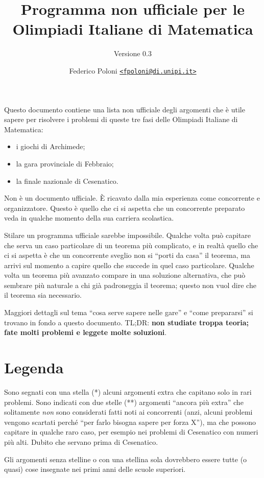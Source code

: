 \documentclass[a4paper,10pt]{paper}
\date{}
\title{Programma non ufficiale per le Olimpiadi Italiane di Matematica}
\subtitle{Versione 0.3}
\author{Federico Poloni \href{mailto:fpoloni@di.unipi.it}{\texttt{<fpoloni@di.unipi.it>}}}
\renewcommand{\star}{(*)}
\newcommand{\sstar}{(**)}
\begin{document}
 \maketitle
 
 Questo documento contiene una lista non ufficiale degli argomenti che è utile sapere per risolvere i problemi di queste tre fasi delle Olimpiadi Italiane di Matematica:
 \begin{itemize}
  \item i giochi di Archimede;
  \item la gara provinciale di Febbraio;
  \item la finale nazionale di Cesenatico.
 \end{itemize}

 Non è un documento ufficiale. È ricavato dalla mia esperienza come concorrente e organizzatore. Questo è quello che ci si aspetta che un concorrente preparato veda in qualche momento della sua carriera scolastica.
 
 Stilare un programma ufficiale sarebbe impossibile. Qualche volta può capitare che serva un caso particolare di un teorema più complicato, e in realtà quello che ci si aspetta è che un concorrente sveglio non si ``porti da casa'' il teorema, ma arrivi sul momento a capire quello che succede in quel caso particolare. Qualche volta un teorema più avanzato compare in una soluzione alternativa, che può sembrare più naturale a chi già padroneggia il teorema; questo non vuol dire che il teorema sia necessario.

 Maggiori dettagli sul tema ``cosa serve sapere nelle gare'' e ``come prepararsi'' si trovano in fondo a questo documento. TL;DR: \textbf{non studiate troppa teoria; fate molti problemi e leggete molte soluzioni}.
 
\section{Legenda}
Sono segnati con una stella \star{} alcuni argomenti extra che capitano solo in rari problemi. Sono indicati con due stelle \sstar{} argomenti ``ancora più extra'' che solitamente \emph{non} sono considerati fatti noti ai concorrenti (anzi, alcuni problemi vengono scartati perché ``per farlo bisogna sapere per forza X''), ma che possono capitare in qualche raro caso, per esempio nei problemi di Cesenatico con numeri più alti. Dubito che servano prima di Cesenatico.

Gli argomenti senza stelline o con una stellina sola dovrebbero essere tutte (o quasi) cose insegnate nei primi anni delle scuole superiori.
\end{document}

